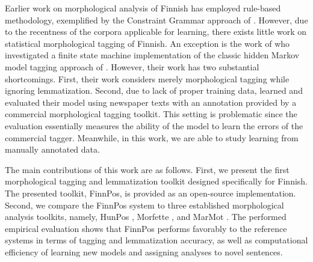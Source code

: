 \documentclass[smallextended]{svjour3}       %
\newcommand{\fixme}[1]{\textsl{[#1]}}
\begin{document}
Earlier work on morphological analysis of Finnish has employed rule-based methodology, exemplified by the Constraint Grammar approach of \citet{karlsson1990}.  
However, due to the recentness of the corpora applicable for learning, there exists little work on statistical morphological tagging of Finnish. An exception is the work of \citet{silfverberg2011} who investigated a finite state machine implementation of the classic hidden Markov model tagging approach of \citet{brants2000}. However, their work has two substantial shortcomings. %
First, their work considers merely morphological tagging while ignoring lemmatization.
Second, due to lack of proper training data, \citet{silfverberg2011} learned and evaluated their model using newspaper texts with an annotation provided by a commercial morphological tagging toolkit. This setting is problematic since the evaluation essentially measures the ability of the model to learn the errors of the commercial tagger. Meanwhile, in this work, we are able to study learning from manually annotated data.   


The main contributions of this work are as follows. First, we present the first morphological tagging and lemmatization toolkit designed specifically for Finnish. The presented toolkit, FinnPos, is provided as an open-source implementation. 
Second, we compare the FinnPos system to three established morphological analysis toolkits, namely, HunPos \citep{halacsy2007}, Morfette \citep{chrupala2008}, and MarMot \citep{muller2013}. The performed empirical evaluation shows that FinnPos performs favorably to the reference systems in terms of tagging and lemmatization accuracy, as well as computational efficiency of learning new models and assigning analyses to novel sentences.

\end{document}
